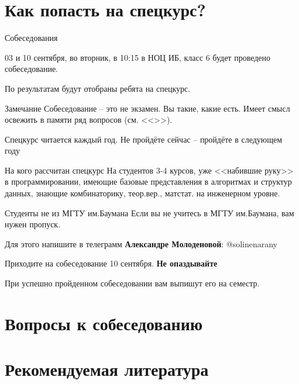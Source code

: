 \documentclass{beamer}
\begin{document}
  \section{Как попасть на спецкурс?}\label{section:how_to}
  
  \begin{frame}{Собеседования}
  
  03 и 10 сентября, во вторник, в 10:15 в НОЦ ИБ, класс 6
  будет проведено собеседование. 
	
  По результатам будут отобраны ребята на спецкурс.

   \begin{block}{Замечание}
   	Собеседование -- это не экзамен. Вы такие, какие есть. 
   	Имеет смысл освежить в памяти ряд вопросов 
   	(см. <<>>).
   	
   	Спецкурс читается каждый год. Не пройдёте сейчас -- 
   	пройдёте в следующем году
   \end{block}
  
  \end{frame}
  
  \begin{frame}{На кого рассчитан спецкурс}
  На студентов 3-4 курсов, уже <<набившие руку>> в программировании,
  имеющие базовые представления в алгоритмах и структур данных,
  знающие комбинаторику, теор.вер., матстат. на инженерном уровне.
  
  \end{frame}

  \begin{frame}{Студенты не из МГТУ им.Баумана}
  Если вы не учитесь в МГТУ им.Баумана, вам нужен пропуск.
  
  Для этого напишите в телеграмм \textbf{Александре Молоденовой}: @solinenarany
  
  Приходите на собеседование 10 сентября. 
  \textbf{Не опаздывайте}
  
  При успешно пройденном собеседовании вам выпишут его на семестр.
  \end{frame}
  
  \section{Вопросы к собеседованию}\label{section:quastions}
  
  \section{Рекомендуемая литература}\label{section:literature}
  
\end{document}
